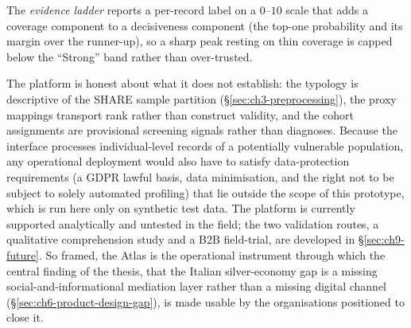 The \emph{evidence ladder} reports a per-record label on a $0$--$10$ scale that adds a coverage component to a decisiveness component (the top-one probability and its margin over the runner-up), so a sharp peak resting on thin coverage is capped below the ``Strong'' band rather than over-trusted.

The platform is honest about what it does not establish: the typology is descriptive of the SHARE sample partition (\S\ref{sec:ch3-preprocessing}), the proxy mappings transport rank rather than construct validity, and the cohort assignments are provisional screening signals rather than diagnoses. Because the interface processes individual-level records of a potentially vulnerable population, any operational deployment would also have to satisfy data-protection requirements (a GDPR lawful basis, data minimisation, and the right not to be subject to solely automated profiling) that lie outside the scope of this prototype, which is run here only on synthetic test data. The platform is currently supported analytically and untested in the field; the two validation routes, a qualitative comprehension study and a B2B field-trial, are developed in \S\ref{sec:ch9-future}. So framed, the Atlas is the operational instrument through which the central finding of the thesis, that the Italian silver-economy gap is a missing social-and-informational mediation layer rather than a missing digital channel (\S\ref{sec:ch6-product-design-gap}), is made usable by the organisations positioned to close it.

\makeatletter
\let\FloatBarrier\IPsavedFloatBarrier
\makeatother
